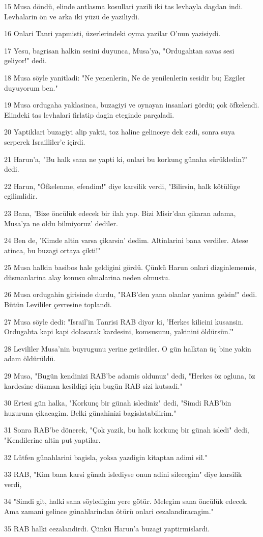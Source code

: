 \par 15 Musa döndü, elinde antlasma kosullari yazili iki tas levhayla dagdan indi. Levhalarin ön ve arka iki yüzü de yaziliydi.
\par 16 Onlari Tanri yapmisti, üzerlerindeki oyma yazilar O'nun yazisiydi.
\par 17 Yesu, bagrisan halkin sesini duyunca, Musa'ya, "Ordugahtan savas sesi geliyor!" dedi.
\par 18 Musa söyle yanitladi: "Ne yenenlerin, Ne de yenilenlerin sesidir bu; Ezgiler duyuyorum ben."
\par 19 Musa ordugaha yaklasinca, buzagiyi ve oynayan insanlari gördü; çok öfkelendi. Elindeki tas levhalari firlatip dagin eteginde parçaladi.
\par 20 Yaptiklari buzagiyi alip yakti, toz haline gelinceye dek ezdi, sonra suya serperek Israilliler'e içirdi.
\par 21 Harun'a, "Bu halk sana ne yapti ki, onlari bu korkunç günaha sürükledin?" dedi.
\par 22 Harun, "Öfkelenme, efendim!" diye karsilik verdi, "Bilirsin, halk kötülüge egilimlidir.
\par 23 Bana, 'Bize öncülük edecek bir ilah yap. Bizi Misir'dan çikaran adama, Musa'ya ne oldu bilmiyoruz' dediler.
\par 24 Ben de, 'Kimde altin varsa çikarsin' dedim. Altinlarini bana verdiler. Atese atinca, bu buzagi ortaya çikti!"
\par 25 Musa halkin basibos hale geldigini gördü. Çünkü Harun onlari dizginlememis, düsmanlarina alay konusu olmalarina neden olmustu.
\par 26 Musa ordugahin girisinde durdu, "RAB'den yana olanlar yanima gelsin!" dedi. Bütün Levililer çevresine toplandi.
\par 27 Musa söyle dedi: "Israil'in Tanrisi RAB diyor ki, 'Herkes kilicini kusansin. Ordugahta kapi kapi dolasarak kardesini, komsusunu, yakinini öldürsün.'"
\par 28 Levililer Musa'nin buyrugunu yerine getirdiler. O gün halktan üç bine yakin adam öldürüldü.
\par 29 Musa, "Bugün kendinizi RAB'be adamis oldunuz" dedi, "Herkes öz ogluna, öz kardesine düsman kesildigi için bugün RAB sizi kutsadi."
\par 30 Ertesi gün halka, "Korkunç bir günah islediniz" dedi, "Simdi RAB'bin huzuruna çikacagim. Belki günahinizi bagislatabilirim."
\par 31 Sonra RAB'be dönerek, "Çok yazik, bu halk korkunç bir günah isledi" dedi, "Kendilerine altin put yaptilar.
\par 32 Lütfen günahlarini bagisla, yoksa yazdigin kitaptan adimi sil."
\par 33 RAB, "Kim bana karsi günah islediyse onun adini silecegim" diye karsilik verdi,
\par 34 "Simdi git, halki sana söyledigim yere götür. Melegim sana öncülük edecek. Ama zamani gelince günahlarindan ötürü onlari cezalandiracagim."
\par 35 RAB halki cezalandirdi. Çünkü Harun'a buzagi yaptirmislardi.

